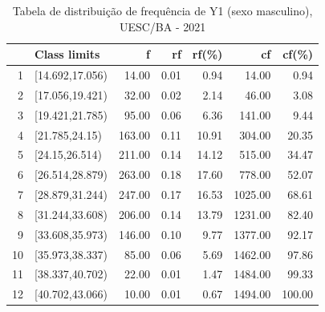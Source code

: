 \documentclass[12pt]{article}\usepackage[]{graphicx}\usepackage[]{color}
\begin{document}
\begin{table}[!ht]
\centering
\caption{Tabela de distribuição de frequência de Y1 (sexo masculino), UESC/BA - 2021}
  \begin{tabular}{rlrrrrr} 
    \toprule
   & Class limits & f & rf & rf(\%) & cf & cf(\%) \\ 
    \midrule
  1 & [14.692,17.056) & 14.00 & 0.01 & 0.94 & 14.00 & 0.94 \\ 
    2 & [17.056,19.421) & 32.00 & 0.02 & 2.14 & 46.00 & 3.08 \\ 
    3 & [19.421,21.785) & 95.00 & 0.06 & 6.36 & 141.00 & 9.44 \\ 
    4 & [21.785,24.15) & 163.00 & 0.11 & 10.91 & 304.00 & 20.35 \\ 
    5 & [24.15,26.514) & 211.00 & 0.14 & 14.12 & 515.00 & 34.47 \\ 
    6 & [26.514,28.879) & 263.00 & 0.18 & 17.60 & 778.00 & 52.07 \\ 
    7 & [28.879,31.244) & 247.00 & 0.17 & 16.53 & 1025.00 & 68.61 \\ 
    8 & [31.244,33.608) & 206.00 & 0.14 & 13.79 & 1231.00 & 82.40 \\ 
    9 & [33.608,35.973) & 146.00 & 0.10 & 9.77 & 1377.00 & 92.17 \\ 
    10 & [35.973,38.337) & 85.00 & 0.06 & 5.69 & 1462.00 & 97.86 \\ 
    11 & [38.337,40.702) & 22.00 & 0.01 & 1.47 & 1484.00 & 99.33 \\ 
    12 & [40.702,43.066) & 10.00 & 0.01 & 0.67 & 1494.00 & 100.00 \\ 
     \bottomrule
  \end{tabular}
\end{table}

\end{document}
